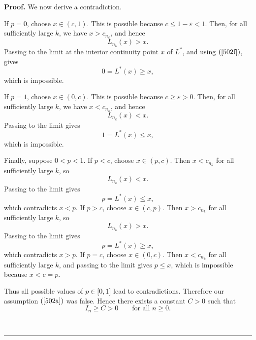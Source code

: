 \documentclass[onecolumn]{article}
\newenvironment{proof}[1][Proof]{\noindent\textbf{#1.} }{\ \rule{0.5em}{0.5em}}
\begin{document}
\begin{proof}
We now derive a contradiction.

\noindent If $p=0$, choose $x\in (c,1)$. This is possible because $c\leq
1-\varepsilon <1$. Then, for all sufficiently large $k$, we have $%
x>c_{n_{k}} $, and hence 
\begin{equation*}
L_{n_{k}}(x)>x.
\end{equation*}%
Passing to the limit at the interior continuity point $x$ of $L^{\ast }$,
and using $(\ref{502f})$, gives 
\begin{equation*}
0=L^{\ast }(x)\geq x,
\end{equation*}%
which is impossible.

If $p=1$, choose $x\in (0,c)$. This is possible because $c\geq \varepsilon
>0 $. Then, for all sufficiently large $k$, we have $x<c_{n_{k}}$, and hence 
\begin{equation*}
L_{n_{k}}(x)<x.
\end{equation*}%
Passing to the limit gives 
\begin{equation*}
1=L^{\ast }(x)\leq x,
\end{equation*}%
which is impossible.

\noindent Finally, suppose $0<p<1$. If $p<c$, choose $x\in (p,c)$. Then $%
x<c_{n_{k}}$ for all sufficiently large $k$, so 
\begin{equation*}
L_{n_{k}}(x)<x.
\end{equation*}%
Passing to the limit gives 
\begin{equation*}
p=L^{\ast }(x)\leq x,
\end{equation*}%
which contradicts $x<p$. If $p>c$, choose $x\in (c,p)$. Then $x>c_{n_{k}}$
for all sufficiently large $k$, so 
\begin{equation*}
L_{n_{k}}(x)>x.
\end{equation*}%
Passing to the limit gives 
\begin{equation*}
p=L^{\ast }(x)\geq x,
\end{equation*}%
which contradicts $x>p$. If $p=c$, choose $x\in (0,c)$. Then $x<c_{n_{k}}$
for all sufficiently large $k$, and passing to the limit gives $p\leq x$,
which is impossible because $x<c=p$.

\noindent Thus all possible values of $p\in \lbrack 0,1]$ lead to
contradictions. Therefore our assumption $(\ref{502a})$ was false. Hence
there exists a constant $C>0$ such that 
\begin{equation}
I_{n}\geq C>0\qquad \text{for all }n\geq 0.  \label{502}
\end{equation}


\end{proof}
\end{document}
